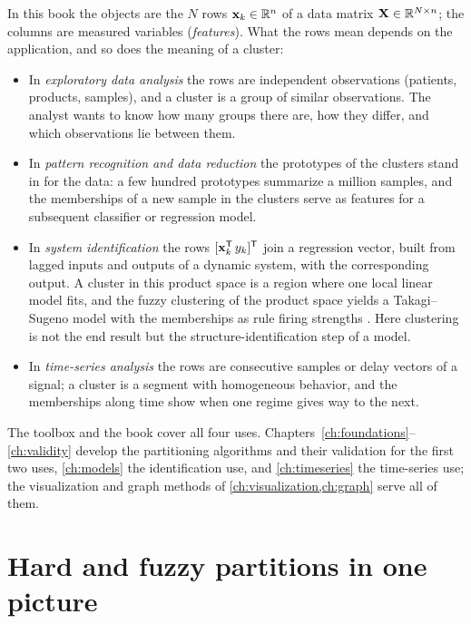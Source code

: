 In this book the objects are the $N$ rows $\mathbf{x}_k\in\mathbb{R}^n$ of a data matrix $\mathbf{X}\in\mathbb{R}^{N\times n}$; the columns are measured variables (\emph{features}). What the rows mean depends on the application, and so does the meaning of a cluster:
\begin{itemize}
  \item In \emph{exploratory data analysis} the rows are independent observations (patients, products, samples), and a cluster is a group of similar observations. The analyst wants to know how many groups there are, how they differ, and which observations lie between them.
  \item In \emph{pattern recognition and data reduction} the prototypes of the clusters stand in for the data: a few hundred prototypes summarize a million samples, and the memberships of a new sample in the clusters serve as features for a subsequent classifier or regression model.
  \item In \emph{system identification} the rows $[\mathbf{x}_k^{\mathsf{T}}\,y_k]^{\mathsf{T}}$ join a regression vector, built from lagged inputs and outputs of a dynamic system, with the corresponding output. A cluster in this product space is a region where one local linear model fits, and the fuzzy clustering of the product space yields a Takagi--Sugeno model with the memberships as rule firing strengths \cite{babuska:1998:book,abonyi:2007:book}. Here clustering is not the end result but the structure-identification step of a model.
  \item In \emph{time-series analysis} the rows are consecutive samples or delay vectors of a signal; a cluster is a segment with homogeneous behavior, and the memberships along time show when one regime gives way to the next.
\end{itemize}
The toolbox and the book cover all four uses. Chapters~\ref{ch:foundations}--\ref{ch:validity} develop the partitioning algorithms and their validation for the first two uses, \cref{ch:models} the identification use, and \cref{ch:timeseries} the time-series use; the visualization and graph methods of \cref{ch:visualization,ch:graph} serve all of them.

\section{Hard and fuzzy partitions in one picture}\label{sec:intro:hardfuzzy}

